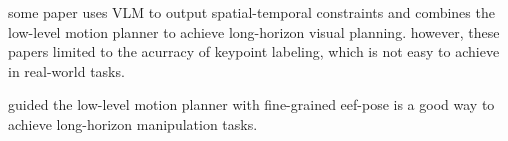 \documentclass{article}
\begin{document}
some paper uses VLM to output spatial-temporal constraints and combines the low-level motion planner to achieve long-horizon visual planning.
\cite{huang2024rekep,zhou2024codeasmonitor} however, these papers limited to the acurracy of keypoint labeling, which is not easy to achieve in real-world tasks.


guided the low-level motion planner with fine-grained eef-pose is a good way to achieve long-horizon manipulation tasks.



\end{document}
